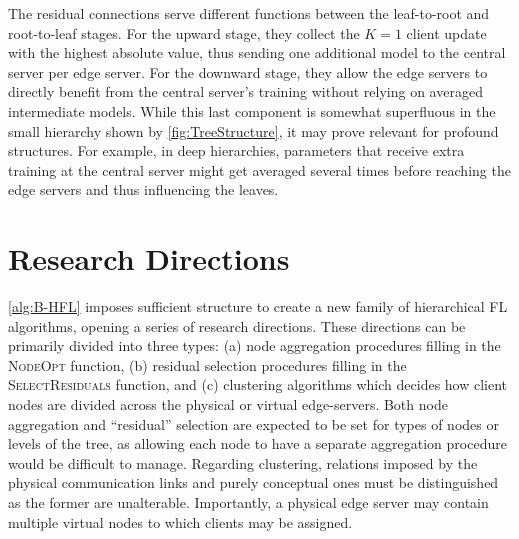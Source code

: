The residual connections serve different functions between the leaf-to-root and root-to-leaf stages. For the upward stage, they collect the $K=1$ client update with the highest absolute value, thus sending one additional model to the central server per edge server. For the downward stage, they allow the edge servers to directly benefit from the central server's training without relying on averaged intermediate models. While this last component is somewhat superfluous in the small hierarchy shown by \cref{fig:TreeStructure}, it may prove relevant for profound structures. For example, in deep hierarchies, parameters that receive extra training at the central server might get averaged several times before reaching the edge servers and thus influencing the leaves.


\section{Research Directions}\label{sec:proposal:research_directions}
\cref{alg:B-HFL} imposes sufficient structure to create a new family of hierarchical FL algorithms, opening a series of research directions. These directions can be primarily divided into three types: (a) node aggregation procedures filling in the \textsc{NodeOpt} function, (b) residual selection procedures filling in the \textsc{SelectResiduals} function, and (c) clustering algorithms which decides how client nodes are divided across the physical or virtual edge-servers. Both node aggregation and ``residual'' selection are expected to be set for types of nodes or levels of the tree, as allowing each node to have a separate aggregation procedure would be difficult to manage. Regarding clustering, relations imposed by the physical communication links and purely conceptual ones must be distinguished as the former are unalterable. Importantly, a physical edge server may contain multiple virtual nodes to which clients may be assigned.

